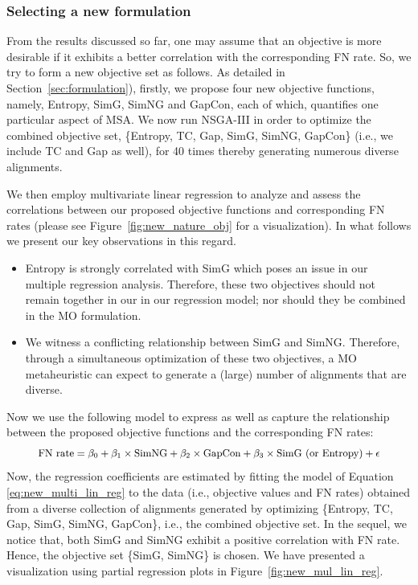 \subsubsection{Selecting a new formulation}
\label{sec:new_msa_formulation}
From the results discussed so far, one may assume that an objective is more desirable if it exhibits a better correlation with the corresponding FN rate.  
So, we try to form a new objective set as follows. As detailed in Section~\ref{sec:formulation}), firstly, we propose four new objective functions, namely, Entropy, SimG, SimNG and GapCon, each of which, quantifies one particular aspect of MSA. We now run NSGA-III in order to optimize the combined objective set, \{Entropy, TC, Gap, SimG, SimNG, GapCon\} (i.e., we include TC and Gap as well), for 40 times thereby generating numerous diverse alignments.

We then employ multivariate linear regression to analyze and assess the correlations between our proposed objective functions and corresponding FN rates (please see Figure~\ref{fig:new_nature_obj} for a visualization). In what follows we present our key observations in this regard.
\begin{itemize}
	\item Entropy is strongly correlated with SimG which poses an issue in our multiple regression analysis. Therefore, these two objectives should not remain together in our in our regression model; nor should they be combined in the MO formulation.
	
	\item We witness a conflicting relationship between SimG and SimNG. Therefore, through a simultaneous optimization of these two objectives, a MO metaheuristic can expect to generate a (large) number of alignments that are diverse.
\end{itemize}

Now we use the following model to express as well as capture the relationship between the proposed objective functions and the corresponding FN rates:
\begin{equation}
\small
\begin{split}
\text{FN rate} = \beta_0 + \beta_1 \times \text{SimNG}+ \beta_2 \times \text{GapCon} + 
\beta_3 \times \text{SimG (or Entropy)} + \epsilon \label{eq:new_multi_lin_reg}
\end{split}
\end{equation}
Now, the regression coefficients are estimated by fitting the model of Equation \ref{eq:new_multi_lin_reg} to the data (i.e., objective values and FN rates) obtained from a diverse collection of alignments generated by optimizing \{Entropy, TC, Gap, SimG, SimNG, GapCon\}, i.e., the combined objective set. In the sequel, we notice that, both SimG and SimNG exhibit a positive correlation with FN rate. Hence, the objective set \{SimG, SimNG\} is chosen. We have presented a visualization using partial regression plots in Figure~\ref{fig:new_mul_lin_reg}.


